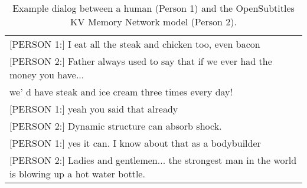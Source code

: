 \documentclass[11pt,a4paper]{article}
\begin{document}
\begin{table*}[t]
\begin{center}
\begin{small}
\begin{tabular}{l|l}
\multicolumn{2}{l}{[PERSON 1:] I eat all the steak and chicken too, even bacon}\\
\multicolumn{2}{l}{[PERSON 2:] Father always used to say that if we ever had the money you have...}\\ \multicolumn{2}{l}{we' d have steak and ice cream three times every day!}\\
\multicolumn{2}{l}{[PERSON 1:] yeah you said that already}\\
\multicolumn{2}{l}{[PERSON 2:] Dynamic structure can absorb shock.}\\
\multicolumn{2}{l}{[PERSON 1:] yes it can. I know about that as a bodybuilder}\\
\multicolumn{2}{l}{[PERSON 2:] Ladies and gentlemen... the strongest man in the world is blowing up a hot water bottle.}\\
      \end{tabular}
      \caption{Example dialog between a human (Person 1) and the OpenSubtitles KV Memory Network model (Person 2). \label{table:os-example}}
    \end{small}
  \end{center}
\end{table*}
\end{document}
